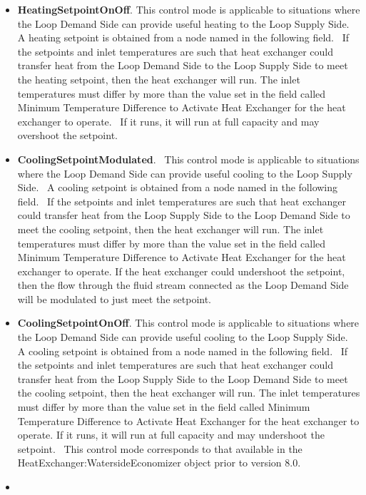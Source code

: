 \begin{itemize}
\item
  \textbf{HeatingSetpointOnOff}. This control mode is applicable to situations where the Loop Demand Side can provide useful heating to the Loop Supply Side.~ A heating setpoint is obtained from a node named in the following field.~ If the setpoints and inlet temperatures are such that heat exchanger could transfer heat from the Loop Demand Side to the Loop Supply Side to meet the heating setpoint, then the heat exchanger will run. The inlet temperatures must differ by more than the value set in the field called Minimum Temperature Difference to Activate Heat Exchanger for the heat exchanger to operate. ~If it runs, it will run at full capacity and may overshoot the setpoint.
\item
  \textbf{CoolingSetpointModulated}.~ This control mode is applicable to situations where the Loop Demand Side can provide useful cooling to the Loop Supply Side.~ A cooling setpoint is obtained from a node named in the following field.~ If the setpoints and inlet temperatures are such that heat exchanger could transfer heat from the Loop Supply Side to the Loop Demand Side to meet the cooling setpoint, then the heat exchanger will run. The inlet temperatures must differ by more than the value set in the field called Minimum Temperature Difference to Activate Heat Exchanger for the heat exchanger to operate. If the heat exchanger could undershoot the setpoint, then the flow through the fluid stream connected as the Loop Demand Side will be modulated to just meet the setpoint.
\item
  \textbf{CoolingSetpointOnOff}. This control mode is applicable to situations where the Loop Demand Side can provide useful cooling to the Loop Supply Side.~ A cooling setpoint is obtained from a node named in the following field.~ If the setpoints and inlet temperatures are such that heat exchanger could transfer heat from the Loop Supply Side to the Loop Demand Side to meet the cooling setpoint, then the heat exchanger will run. The inlet temperatures must differ by more than the value set in the field called Minimum Temperature Difference to Activate Heat Exchanger for the heat exchanger to operate. If it runs, it will run at full capacity and may undershoot the setpoint.~ This control mode corresponds to that available in the HeatExchanger:WatersideEconomizer object prior to version 8.0.
\item

\end{itemize}
